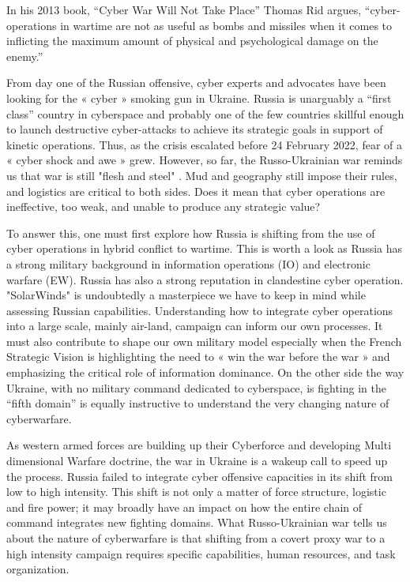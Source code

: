 In his 2013 book, “Cyber War Will Not Take Place” Thomas Rid argues, “cyber-operations in wartime are not as useful as bombs and missiles when it comes to inflicting the maximum amount of physical and psychological damage on the enemy.” 

From day one of the Russian offensive, cyber experts and advocates have been looking for the « cyber » smoking gun in Ukraine. Russia is unarguably a “first class” country in cyberspace and probably one of the few countries skillful enough to launch destructive cyber-attacks to achieve its strategic goals in support of kinetic operations. Thus, as the crisis escalated before 24 February 2022, fear of a « cyber shock and awe » grew. However, so far, the Russo-Ukrainian war reminds us that war is still "flesh and steel" . Mud and geography still impose their rules, and logistics are critical to both sides. Does it mean that cyber operations are ineffective, too weak, and unable to produce any strategic value? 


To answer this, one must first explore how Russia is shifting from the use of cyber operations in hybrid conflict to wartime. This is worth a look as Russia has a strong military background in information operations (IO) and electronic warfare (EW). Russia has also a strong reputation in clandestine cyber operation. "SolarWinds" is undoubtedly a masterpiece we have to keep in mind while assessing Russian capabilities. Understanding how to integrate cyber operations into a large scale, mainly air-land, campaign can inform our own processes. It must also contribute to shape our own military model especially when the French Strategic Vision is highlighting the need to « win the war before the war » and emphasizing the critical role of information dominance. On the other side the way Ukraine, with no military command dedicated to cyberspace, is fighting in the “fifth domain” is equally instructive to understand the very changing nature of cyberwarfare.

As western armed forces are building up their Cyberforce and developing Multi dimensional Warfare doctrine, the war in Ukraine is a wakeup call to speed up the process. Russia failed to integrate cyber offensive capacities in its shift from low to high intensity. This shift is not only a matter of force structure, logistic and fire power; it may broadly have an impact on how the entire chain of command integrates new fighting domains. What Russo-Ukrainian war tells us about the nature of cyberwarfare is that shifting from a covert proxy war to a high intensity campaign requires specific capabilities, human resources, and task organization.

